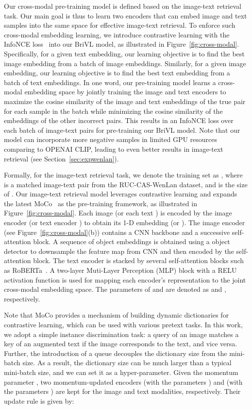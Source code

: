 \documentclass[10pt,twocolumn,letterpaper]{article}
\begin{document}
Our cross-modal pre-training model is defined based on the image-text retrieval task. Our main goal is thus to learn two encoders that can embed image and text samples into the same space for effective image-text retrieval. 
To enforce such cross-modal embedding learning, we introduce contrastive learning with the InfoNCE loss~\cite{oord2018representation} into our BriVL model, as illustrated in Figure~\ref{fig:cross-modal}. Specifically, for a given text embedding, our learning objective is to find the best image embedding from a batch of image embeddings. Similarly, for a given image embedding, our learning objective is to find the best text embedding from a batch of text embeddings. 
In one word, our pre-training model learns a cross-modal embedding space by jointly training the image and text encoders to maximize the cosine similarity of the image and text embeddings of the true pair for each sample in the batch while minimizing the cosine similarity of the embeddings of the other incorrect pairs. 
This results in an InfoNCE loss over each batch of image-text pairs for pre-training our BriVL model.
Note that our model can incorporate more negative samples in limited GPU resources comparing to OPENAI CLIP, leading to even better results in image-text retrieval (see Section~\ref{sec:expwenlan}).

Formally, for the image-text retrieval task, we denote the training set as , where  is a matched image-text pair from the RUC-CAS-WenLan dataset, and  is the size of .
Our image-text retrieval model leverages contrastive learning and expands the latest MoCo~\cite{he2020momentum} as the pre-training framework, as illustrated in Figure~\ref{fig:cross-modal}. Each image  (or each text ) is encoded by the image encoder  (or text encoder ) to obtain its 1-D embedding   (or ). The image encoder (see Figure~\ref{fig:cross-modal}(b)) contains a CNN backbone and a successive self-attention block. A sequence of object embeddings is obtained using a object detector to downsample the feature map from CNN and then encoded by the self-attention block. The text encoder is stacked by several self-attention blocks such as RoBERTa~\cite{liu2019roberta}.
A two-layer Muti-Layer Perception (MLP) block with a RELU activation function is used for mapping each encoder’s representation to the joint cross-modal embedding space.
The parameters of  and  are denoted as  and , respectively.

Note that MoCo provides a mechanism of building dynamic dictionaries for contrastive learning, which can be used with various pretext tasks. In this work, we adopt a simple instance discrimination task: a query of an image matches a key of an augmented text if the image corresponds to the text, and vice versa. Further, the introduction of a queue decouples the dictionary size from the mini-batch size. As a result, the dictionary size can be much larger than a typical mini-batch size, and we can set it as a hyper-parameter. Given the momentum parameter , two momentum-updated encoders  (with the parameters ) and  (with the parameters ) are kept for the image and text modalities, respectively. Their update rule is given by:
\end{document}
